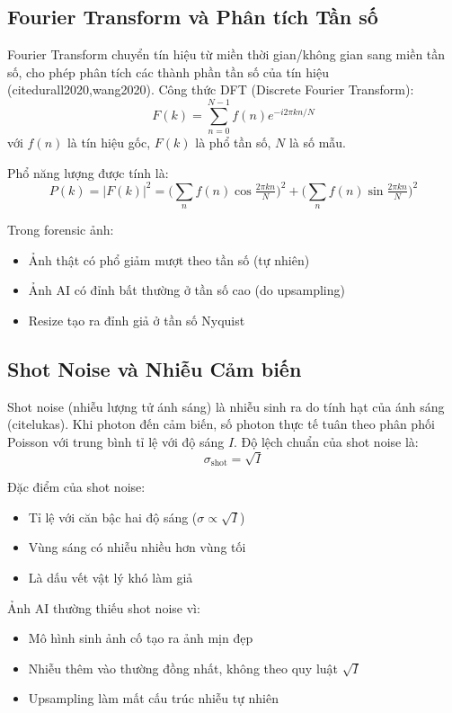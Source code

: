 \subsection{Fourier Transform và Phân tích Tần số}
Fourier Transform chuyển tín hiệu từ miền thời gian/không gian sang miền tần số, cho phép phân tích các thành phần tần số của tín hiệu \\(cite{durall2020,wang2020}). Công thức DFT (Discrete Fourier Transform):
\[
F(k)=\sum_{n=0}^{N-1}f(n)e^{-i2\pi kn/N}
\]
với $f(n)$ là tín hiệu gốc, $F(k)$ là phổ tần số, $N$ là số mẫu.

Phổ năng lượng được tính là:
\[
P(k)=|F(k)|^2=\Big(\sum_{n} f(n)\cos\tfrac{2\pi kn}{N}\Big)^2+\Big(\sum_{n} f(n)\sin\tfrac{2\pi kn}{N}\Big)^2
\]

Trong forensic ảnh:
\begin{itemize}
  \item Ảnh thật có phổ giảm mượt theo tần số (tự nhiên)
  \item Ảnh AI có đỉnh bất thường ở tần số cao (do upsampling)
  \item Resize tạo ra đỉnh giả ở tần số Nyquist
\end{itemize}

\subsection{Shot Noise và Nhiễu Cảm biến}
Shot noise (nhiễu lượng tử ánh sáng) là nhiễu sinh ra do tính hạt của ánh sáng \\(cite{lukas}). Khi photon đến cảm biến, số photon thực tế tuân theo phân phối Poisson với trung bình tỉ lệ với độ sáng $I$. Độ lệch chuẩn của shot noise là:
\[
\sigma_{\text{shot}}=\sqrt{I}
\]

Đặc điểm của shot noise:
\begin{itemize}
  \item Tỉ lệ với căn bậc hai độ sáng ($\sigma\propto\sqrt{I}$)
  \item Vùng sáng có nhiễu nhiều hơn vùng tối
  \item Là dấu vết vật lý khó làm giả
\end{itemize}

Ảnh AI thường thiếu shot noise vì:
\begin{itemize}
  \item Mô hình sinh ảnh cố tạo ra ảnh mịn đẹp
  \item Nhiễu thêm vào thường đồng nhất, không theo quy luật $\sqrt{I}$
  \item Upsampling làm mất cấu trúc nhiễu tự nhiên
\end{itemize}

